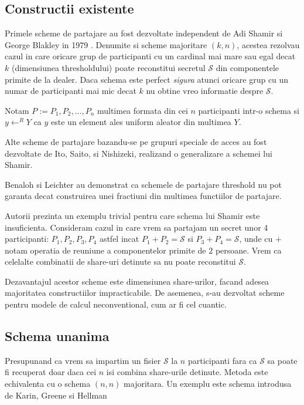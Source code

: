 \documentclass{llncs}
\begin{document}
\subsection{Constructii existente}
Primele scheme de partajare au fost dezvoltate independent de Adi Shamir si George Blakley in 1979 \cite{B:1979, S:1979}.
Denumite si scheme majoritare $(k, n)$, acestea rezolvau cazul in care oricare grup de participanti cu un cardinal mai mare sau egal decat $k$  (dimensiunea thresholdului) poate reconstitui secretul $\mathcal{S}$ din componentele primite de la dealer. Daca schema este perfect \textit{sigura} atunci oricare grup cu un numar de participanti mai mic decat $k$ nu obtine vreo informatie despre $\mathcal{S}$.

Notam $P := P_1, P_2, \dots, P_n$ multimea formata din cei $n$ participanti intr-o schema si $y \leftarrow^R Y$ ca $y$ este un element ales uniform aleator din multimea $Y$.

Alte scheme de partajare bazandu-se pe grupuri speciale de acces au fost dezvoltate de Ito, Saito, si Nishizeki, realizand o generalizare a schemei lui Shamir. \cite{ITO:1989}

Benaloh si Leichter au demonstrat ca schemele de partajare threshold nu pot garanta decat construirea unei fractiuni din multimea functiilor de partajare\cite{JJ:1990}.

Autorii prezinta un exemplu trivial pentru care schema lui Shamir este insuficienta. Consideram cazul in care vrem sa partajam un secret unor 4 participanti: $P_1, P_2, P_3, P_4$ astfel incat $P_1 + P_2 = \mathcal{S}$ si $P_3 + P_4 = \mathcal{S}$, unde cu $+$ notam operatia de reuniune a componentelor primite de $2$ persoane. Vrem ca celelalte combinatii de share-uri detinute sa nu poate reconstitui $\mathcal{S}$.

Dezavantajul acestor scheme este dimensiunea share-urilor, facand adesea majoritatea constructiilor impracticabile. \cite{Survey:2011}
De asemenea, s-au dezvoltat scheme pentru modele de calcul neconventional, cum ar fi cel cuantic. \cite{hillery:1999} %

\subsection{Schema unanima}

Presupunand ca vrem sa impartim un fisier $\mathcal{S}$ la $n$ participanti fara ca $\mathcal{S}$ sa poate fi recuperat doar daca cei $n$ isi combina share-urile detinute. Metoda este echivalenta cu o schema $(n, n)$ majoritara. Un exemplu este schema introdusa de Karin, Greene si Hellman \cite{Karnin:83}
\end{document}
